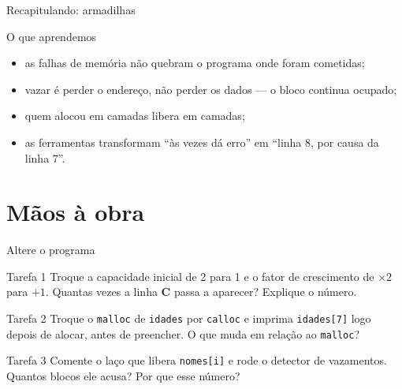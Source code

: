 \documentclass[aspectratio=169]{beamer}
\begin{document}
\begin{frame}{Recapitulando: armadilhas}
  \begin{block}{O que aprendemos}
    \begin{itemize}
      \item as falhas de memória não quebram o programa onde foram cometidas;
      \item vazar é perder o endereço, não perder os dados --- o bloco continua
        ocupado;
      \item quem alocou em camadas libera em camadas;
      \item as ferramentas transformam ``às vezes dá erro'' em ``linha 8, por
        causa da linha 7''.
    \end{itemize}
  \end{block}
\end{frame}

\section{Mãos à obra}

\begin{frame}{Altere o programa}
  \begin{block}{Tarefa 1}
    Troque a capacidade inicial de 2 para 1 e o fator de crescimento de
    $\times 2$ para $+1$. Quantas vezes a linha \textbf{C} passa a aparecer?
    Explique o número.
  \end{block}
  \begin{block}{Tarefa 2}
    Troque o \texttt{malloc} de \texttt{idades} por \texttt{calloc} e imprima
    \texttt{idades[7]} logo depois de alocar, antes de preencher. O que muda em
    relação ao \texttt{malloc}?
  \end{block}
  \begin{block}{Tarefa 3}
    Comente o laço que libera \texttt{nomes[i]} e rode o detector de vazamentos.
    Quantos blocos ele acusa? Por que esse número?
  \end{block}
\end{frame}
\end{document}
